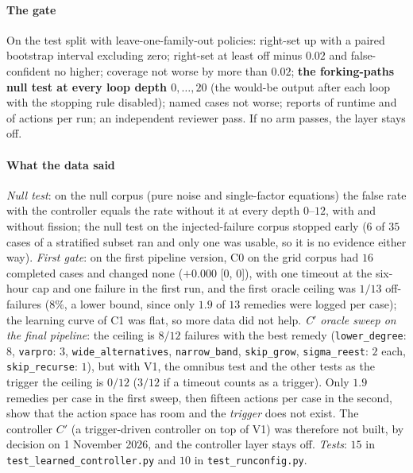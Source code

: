 \paragraph{The gate} On the test split with leave-one-family-out policies: right-set up with a paired bootstrap interval excluding zero; right-set at least off minus $0.02$ and false-confident no higher; coverage not worse by more than $0.02$; \textbf{the forking-paths null test at every loop depth $0,\dots,20$} (the would-be output after each loop with the stopping rule disabled); named cases not worse; reports of runtime and of actions per run; an independent reviewer pass. If no arm passes, the layer stays off.

\paragraph{What the data said} \emph{Null test}: on the null corpus (pure noise and single-factor equations) the false \FC{} rate with the controller equals the rate without it at every depth $0$--$12$, with and without fission; the null test on the injected-failure corpus stopped early ($6$ of $35$ cases of a stratified subset ran and only one was usable, so it is no evidence either way).
\emph{First gate}: on the first pipeline version, C0 on the grid corpus had $16$ completed cases and changed none ($+0.000$ [$0$, $0$]), with one timeout at the six-hour cap and one failure in the first run, and the first oracle ceiling was $1/13$ off-failures ($8\%$, a lower bound, since only $1.9$ of $13$ remedies were logged per case); the learning curve of C1 was flat, so more data did not help.
\emph{C$'$ oracle sweep on the final pipeline}: the ceiling is $8/12$ failures with the best remedy (\texttt{lower\_degree}: $8$, \texttt{varpro}: $3$, \texttt{wide\_alternatives}, \texttt{narrow\_band}, \texttt{skip\_grow}, \texttt{sigma\_reest}: $2$ each, \texttt{skip\_recurse}: $1$), but with V1, the omnibus test and the other tests as the trigger the ceiling is $0/12$ ($3/12$ if a timeout counts as a trigger).
Only $1.9$ remedies per case in the first sweep, then fifteen actions per case in the second, show that the action space has room and the \emph{trigger} does not exist. The controller $C'$ (a trigger-driven controller on top of V1) was therefore not built, by decision on 1 November 2026, and the controller layer stays off.
\emph{Tests}: $15$ in \texttt{test\_learned\_controller.py} and $10$ in \texttt{test\_runconfig.py}.

